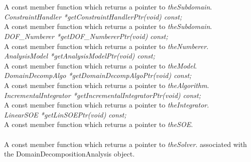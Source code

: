   \\
 \\
A const member function which returns a pointer to {\em theSubdomain}. \\

{\em ConstraintHandler *getConstraintHandlerPtr(void) const;}\\
A const member function which returns a pointer to {\em theSubdomain}.\\

{\em DOF\_Numberer *getDOF\_NumbererPtr(void) const;}\\
A const member function which returns a pointer to {\em
theNumberer}.\\

{\em AnalysisModel  *getAnalysisModelPtr(void) const;}\\
A const member function which returns a pointer to {\em
theModel}.\\

{\em DomainDecompAlgo  *getDomainDecompAlgoPtr(void) const;}\\
A const member function which returns a pointer to {\em
theAlgorithm}.\\

{\em IncrementalIntegrator *getIncrementalIntegratorPtr(void) const;}\\
A const member function which returns a pointer to {\em
theIntegrator}.\\

{\em LinearSOE *getLinSOEPtr(void) const;}\\
A const member function which returns a pointer to {\em theSOE}.\\

 \\
A const member function which returns a pointer to {\em theSolver}.
associated with the DomainDecompositionAnalysis object. \\

